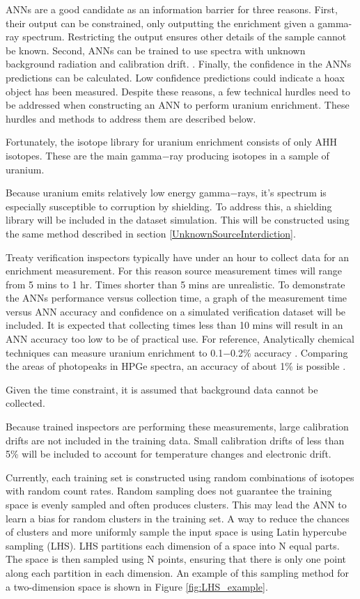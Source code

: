 \documentclass[tocnosub,noragright,centerchapter,12pt,fullpage]{uiucecethesis09}
\begin{document}
ANNs are a good candidate as an information barrier for three reasons. First, their output can be constrained, only outputting the enrichment given a gamma-ray spectrum. Restricting the output ensures other details of the sample cannot be known. Second, ANNs can be trained to use spectra with unknown background radiation and calibration drift. . Finally, the confidence in the ANNs predictions can be calculated. Low confidence predictions could indicate a hoax object has been measured. Despite these reasons, a few technical hurdles need to be addressed when constructing an ANN to perform uranium enrichment. These hurdles and methods to address them are described below.

Fortunately, the isotope library for uranium enrichment consists of only AHH isotopes. These are the main gamma$-$ray producing isotopes in a sample of uranium. 

Because uranium emits relatively low energy gamma$-$rays, it's spectrum is especially susceptible to corruption by shielding. To address this, a shielding library will be included in the dataset simulation. This will be constructed using the same method described in section \ref{UnknownSourceInterdiction}.

Treaty verification inspectors typically have under an hour to collect data for an enrichment measurement. For this reason source measurement times will range from 5 mins to 1 hr. Times shorter than 5 mins are unrealistic. To demonstrate the ANNs performance versus collection time, a graph of the measurement time versus ANN accuracy and confidence on a simulated verification dataset will be included. It is expected that collecting times less than 10 mins will result in an ANN accuracy too low to be of practical use. For reference, Analytically chemical techniques can measure uranium enrichment to 0.1$-$0.2\% accuracy \cite{Pandas_Ch7_1991}. Comparing the areas of photopeaks in HPGe spectra, an accuracy of about 1\% is possible \cite{Pandas_Ch7_1991}. 

Given the time constraint, it is assumed that background data cannot be collected. 

Because trained inspectors are performing these measurements, large calibration drifts are not included in the training data. Small calibration drifts of less than 5\% will be included to account for temperature changes and electronic drift.



Currently, each training set is constructed using random combinations of isotopes with random count rates. Random sampling does not guarantee the training space is evenly sampled and often produces clusters. This may lead the ANN to learn a bias for random clusters in the training set. A way to reduce the chances of clusters and more uniformly sample the input space is using Latin hypercube sampling (LHS). LHS partitions each dimension of a space into N equal parts. The space is then sampled using N points, ensuring that there is only one point along each partition in each dimension. An example of this sampling method for a two-dimension space is shown in Figure \ref{fig:LHS_example}.
\end{document}
